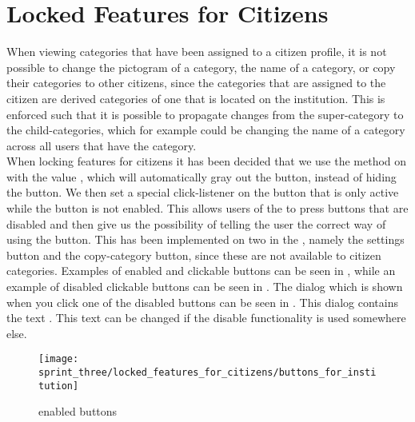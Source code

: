 
\section{Locked Features for Citizens}
\label{sec:locked_features_for_citizens}

When viewing categories that have been assigned to a citizen profile, it is not possible to change the pictogram of a category, the name of a category, or copy their categories to other citizens, since the categories that are assigned to the citizen are derived categories of one that is located on the institution. This is enforced such that it is possible to propagate changes from the super-category to the child-categories, which for example could be changing the name of a category across all users that have the category.\\

When locking features for citizens it has been decided that we use the  method on  with the value , which will automatically gray out the button, instead of hiding the button. We then set a special click-listener on the button that is only active while the button is not enabled. This allows users of the \ct to press buttons that are disabled and then give us the possibility of telling the user the correct way of using the button. This has been implemented on two  in the \ct, namely the settings button and the copy-category button, since these are not available to citizen categories. Examples of enabled and clickable buttons can be seen in , while an example of disabled clickable buttons can be seen in . The dialog which is shown when you click one of the disabled buttons can be seen in . This dialog contains the text . This text can be changed if the disable functionality is used somewhere else. 

\begin{figure}[!htbp]
        \centering
        \texttt{[image: sprint\_three/locked\_features\_for\_citizens/buttons\_for\_institution]}
        \caption{\ct enabled buttons}
        \label{fig:ct_enabled_buttons}
\end{figure}

